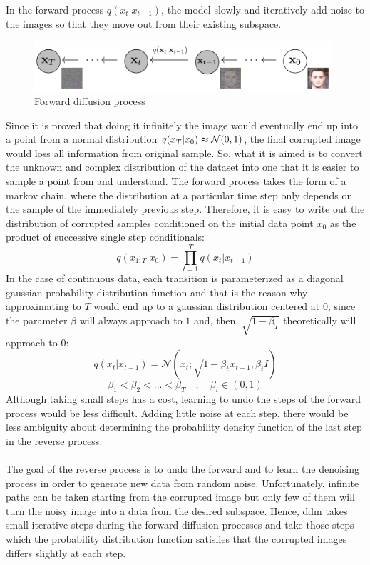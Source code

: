\documentclass[../main.tex]{subfiles}
\begin{document}
In the forward process $q(x_{t}|x_{t-1})$, the model slowly and iteratively add noise to the images so that they move out from their existing subspace. 
\begin{figure}[H]
	\centering
	\includegraphics[width=11cm]{imgs/relatedwork/forward-diffusion}
	\caption{Forward diffusion process}
	\label{fig:related-forward-diffusion}
\end{figure}
Since it is proved that doing it infinitely the image would eventually end up into a point from a normal distribution $q(x_T|x_0) \thickapprox \mathcal{N}(0,1) $, the final corrupted image would loss all information from original sample. So, what it is aimed is to convert the unknown and complex distribution of the dataset into one that it is easier to sample a point from and understand. The forward process takes the form of a markov chain, where the distribution at a particular time step only depends on the sample of the immediately previous step. Therefore, it is easy to write out the distribution of corrupted samples conditioned on the initial data point $x_0$ as the product of successive single step conditionals:
\[q(x_{1:T} | x_0) = \prod_{t=1}^{T} q(x_t|x_{t-1})\]
In the case of continuous data, each transition is parameterized as a diagonal gaussian probability distribution function and that is the reason why approximating to $T$ would end up to a gaussian distribution centered at 0, since the parameter $\beta$ will always approach to $1$ and, then, $\sqrt{1 - \beta_T}$ theoretically will approach to 0:
\[q(x_{t}|x_{t-1}) = \mathcal{N}(x_t; \sqrt{1 - \beta_t} x_{t-1}, \beta_t I)\]
\[ \beta_1 < \beta_2 < ... < \beta_T \quad ; \quad \beta_t \in (0,1) \]
Although taking small steps has a cost, learning to undo the steps of the forward process would be less difficult. Adding little noise at each step, there would be less ambiguity about determining the probability density function of the last step in the reverse process.
\\	%
\\
The goal of the reverse process is to undo the forward and to learn the denoising process in order to generate new data from random noise. Unfortunately, infinite paths can be taken starting from the corrupted image but only few of them will turn the noisy image into a data from the desired subspace. Hence, \gls{ddm} takes small iterative steps during the forward diffusion processes and take those steps which the probability distribution function satisfies that the corrupted images differs slightly at each step.
\end{document}
